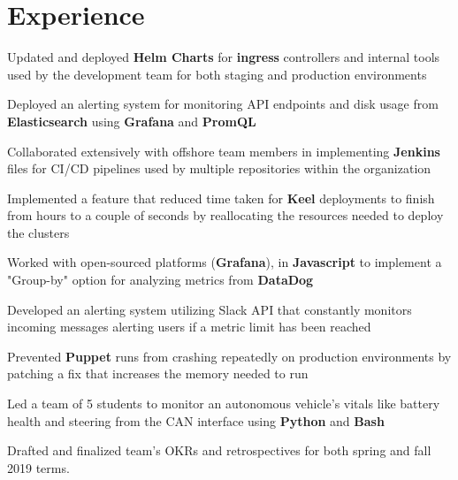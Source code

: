 \documentclass[]{deedy-resume-openfont}
\begin{document}
\begin{minipage}[t]{0.66\textwidth} 


\section{Experience}
\vspace{\topsep} %
\begin{tightemize} 
\item Updated and deployed \textbf{Helm Charts} for \textbf{ingress} controllers and internal tools used by the development team for both staging and production environments
\item Deployed an alerting system for monitoring API endpoints and disk usage  from \textbf{Elasticsearch} using \textbf{Grafana} and \textbf{PromQL} 
\item Collaborated extensively with offshore team members in implementing \textbf{Jenkins} files for CI/CD pipelines used by multiple repositories within the organization 
\item Implemented a feature that reduced time taken for \textbf{Keel} deployments to finish from hours to a couple of seconds by reallocating the resources needed to deploy the clusters
\end{tightemize}
\sectionsep
{}
\begin{tightemize} 
\item Worked with open-sourced platforms (\textbf{Grafana}), in \textbf{Javascript} to implement a "Group-by" option for analyzing metrics from \textbf {DataDog}
\item Developed an alerting system utilizing Slack API that constantly monitors incoming messages alerting users if a metric limit has been reached
\item  Prevented \textbf{Puppet} runs from crashing repeatedly on production environments by patching a fix that increases the memory needed to run
\end{tightemize}
\sectionsep

\begin{tightemize}
\item Led a team of 5 students to monitor an autonomous vehicle's vitals like battery health and steering from the CAN interface using \textbf{Python} and \textbf{Bash}
\item Drafted and finalized team's OKRs and retrospectives for both spring and fall 2019 terms.
\end{tightemize}
\sectionsep


\end{minipage}
\end{document}
